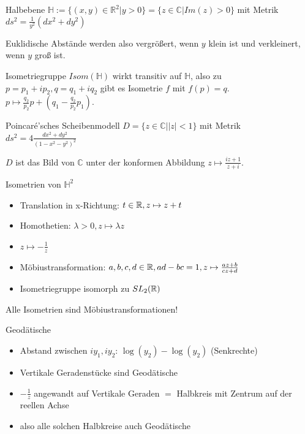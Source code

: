 \begin{defi}{Halbebene}
    $\mathbb{H}:= \{(x,y) \in \mathbb{R}^2 | y > 0\} = \{z \in \mathbb{C} | Im(z)>0\}$
    mit Metrik $ds^2 = \frac{1}{y^2}(dx^2+dy^2)$
\end{defi}

\begin{bem}
    Euklidische Abstände werden also 
    vergrößert,  wenn $y$ klein ist und 
    verkleinert, wenn $y$ groß ist.
\end{bem}

\begin{bem}
    Isometriegruppe $Isom(\mathbb{H})$ wirkt transitiv auf $\mathbb{H}$,
    also zu $p=p_1+ip_2,q=q_1+iq_2$ gibt es Isometrie $f$ mit $f(p)=q$.
    $p \mapsto \frac{q_2}{p_2}p + (q_1 - \frac{q_2}{p_2}p_1)$.
\end{bem}

\begin{defi}{Poincaré'sches Scheibenmodell}
    $ D = \{z \in \mathbb{C} | |z|<1\}$ 
    mit Metrik $ds^2 = 4\frac{dx^2+dy^2}{(1-x^2-y^2)^2}$
\end{defi}

\begin{bem}
    $D$ ist das Bild von $\mathbb{C}$ unter der konformen Abbildung 
    $z\mapsto\frac{iz+1}{z+i}$.
\end{bem}

\begin{bem}{Isometrien von $\mathbb{H}^2$}
    \begin{itemize}
        \item Translation in x-Richtung: $t \in \mathbb R, z \mapsto z+t$
        \item Homothetien: $\lambda > 0, z \mapsto \lambda z$
        \item $z \mapsto -\frac{1}{z}$
        \item Möbiustransformation: $a,b,c,d \in \mathbb R, ad-bc=1,z \mapsto \frac{az+b}{cz+d}$
        \item Isometriegruppe isomorph zu $SL_2(\mathbb R)$
    \end{itemize}
    Alle Isometrien sind Möbiustransformationen!
\end{bem}


\begin{bem}{Geodätische}
    \begin{itemize}
        \item Abstand zwischen $iy_1, iy_2$: $\log(y_2)-\log(y_2)$ (Senkrechte)
        \item Vertikale Geradenstücke sind Geodätische
        \item $-\frac{1}{z}$ angewandt auf Vertikale Geraden $=$ Halbkreis mit Zentrum auf der reellen Achse
        \item also alle solchen Halbkreise auch Geodätische
    \end{itemize}
\end{bem}

